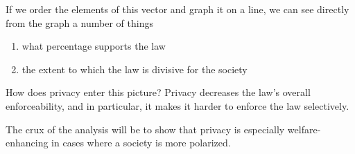%
%
%
%
%
%
%

If we order the elements of this vector and graph it on a line, we can see directly from the graph a number of things
\begin{enumerate}
\item what percentage supports the law
\item the extent to which the law is divisive for the society
\end{enumerate}

How does privacy enter this picture?
Privacy decreases the law's overall enforceability, and in particular, it makes it harder to enforce the law selectively.

The crux of the analysis will be to show that privacy is especially welfare-enhancing in cases where a society is more polarized.